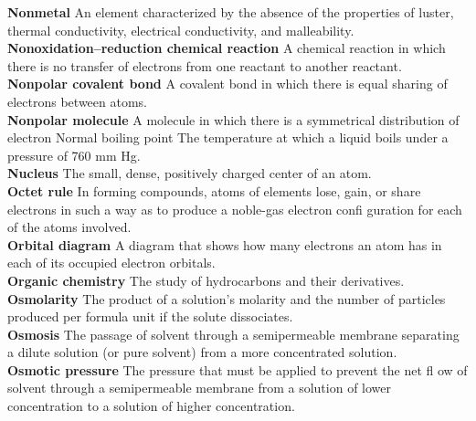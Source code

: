\documentclass[10pt, roman]{article}
\begin{document}
\begin{minipage}[c]{0.30\textwidth}
\textbf{Nonmetal} An element characterized by the absence of the properties of luster, thermal conductivity, electrical conductivity, and malleability. \\
\textbf{Nonoxidation–reduction chemical reaction} A chemical reaction in which there is no transfer of electrons from one reactant to another reactant. \\
\textbf{Nonpolar covalent bond} A covalent bond in which there is equal sharing of electrons between atoms. \\
\textbf{Nonpolar molecule} A molecule in which there is a symmetrical distribution of electron Normal boiling point The temperature at which a liquid boils under a pressure of 760 mm Hg. \\
\textbf{Nucleus} The small, dense, positively charged center of an atom. \\
\textbf{Octet rule} In forming compounds, atoms of elements lose, gain, or share electrons in such a way as to produce a noble-gas electron confi guration for each of the atoms involved. \\
\textbf{Orbital diagram} A diagram that shows how many electrons an atom has in each of its occupied electron orbitals. \\
\textbf{Organic chemistry} The study of hydrocarbons and their derivatives. \\
\textbf{Osmolarity} The product of a solution’s molarity and the number of particles produced per formula unit if the solute dissociates. \\
\textbf{Osmosis} The passage of solvent through a semipermeable membrane separating a dilute solution (or pure solvent) from a more concentrated solution. \\
\textbf{Osmotic pressure} The pressure that must be applied to prevent the net fl ow of solvent through a semipermeable membrane from a solution of lower concentration to a solution of higher concentration. \\
\end{minipage}%
\hfill
\end{document}
